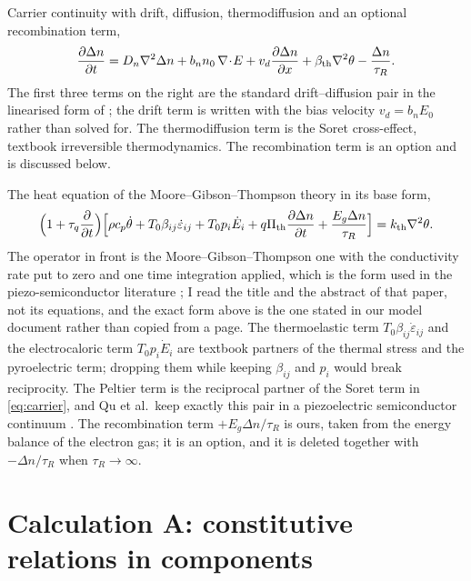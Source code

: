 \documentclass[11pt]{article}
\begin{document}
Carrier continuity with drift, diffusion, thermodiffusion and an optional recombination term,
\begin{equation}
\frac{\partial\Delta n}{\partial t}
=D_n\nabla^2\Delta n+b_nn_0\,\nabla\!\cdot\!E
+v_d\frac{\partial\Delta n}{\partial x}
+\beta_{\rm th}\nabla^2\theta-\frac{\Delta n}{\tau_R}.
\label{eq:carrier}
\end{equation}
The first three terms on the right are the standard drift--diffusion pair in the linearised form of
\cite[Eqs.~(3), (7)]{YangZhou2005}; the drift term is written with the bias velocity $v_d=b_nE_0$ rather
than solved for. The thermodiffusion term is the Soret cross-effect, textbook irreversible
thermodynamics. The recombination term is an option and is discussed below.

The heat equation of the Moore--Gibson--Thompson theory in its base form,
\begin{equation}
\Bigl(1+\tau_q\frac{\partial}{\partial t}\Bigr)
\Bigl[\rho c_p\dot\theta+T_0\beta_{ij}\dot\varepsilon_{ij}
+T_0p_i\dot E_i+q\Pi_{\rm th}\frac{\partial\Delta n}{\partial t}
+\frac{E_g\Delta n}{\tau_R}\Bigr]
=k_{\rm th}\nabla^2\theta .
\label{eq:heat}
\end{equation}
The operator in front is the Moore--Gibson--Thompson one with the conductivity rate put to zero and one
time integration applied, which is the form used in the piezo-semiconductor literature
\cite{Gupta2025}; I read the title and the abstract of that paper, not its equations, and the exact form
above is the one stated in our model document rather than copied from a page. The thermoelastic term
$T_0\beta_{ij}\dot\varepsilon_{ij}$ and the electrocaloric term $T_0p_i\dot E_i$ are textbook partners of
the thermal stress and the pyroelectric term; dropping them while keeping $\beta_{ij}$ and $p_i$ would
break reciprocity. The Peltier term is the reciprocal partner of the Soret term in \eqref{eq:carrier}, and
Qu et al.\ keep exactly this pair in a piezoelectric semiconductor continuum \cite{Qu2023}. The
recombination term $+E_g\Delta n/\tau_R$ is ours, taken from the energy balance of the electron gas; it is
an option, and it is deleted together with $-\Delta n/\tau_R$ when $\tau_R\to\infty$.

\section{Calculation A: constitutive relations in components}\label{sec:calcA}
\end{document}
